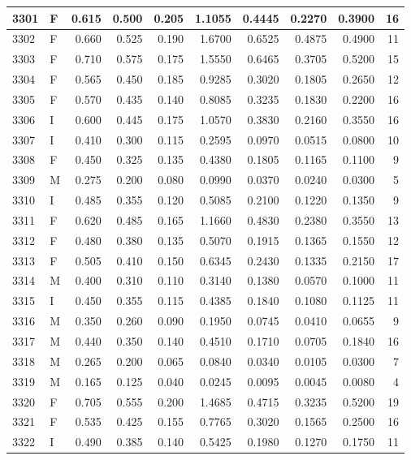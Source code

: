 \documentclass[9pt,twocolumn,twoside,]{pnas-new}
\begin{document}
\begin{tabular}{l|l|r|r|r|r|r|r|r|r}
\hline
3301 & F & 0.615 & 0.500 & 0.205 & 1.1055 & 0.4445 & 0.2270 & 0.3900 & 16\\
\hline
3302 & F & 0.660 & 0.525 & 0.190 & 1.6700 & 0.6525 & 0.4875 & 0.4900 & 11\\
\hline
3303 & F & 0.710 & 0.575 & 0.175 & 1.5550 & 0.6465 & 0.3705 & 0.5200 & 15\\
\hline
3304 & F & 0.565 & 0.450 & 0.185 & 0.9285 & 0.3020 & 0.1805 & 0.2650 & 12\\
\hline
3305 & F & 0.570 & 0.435 & 0.140 & 0.8085 & 0.3235 & 0.1830 & 0.2200 & 16\\
\hline
3306 & I & 0.600 & 0.445 & 0.175 & 1.0570 & 0.3830 & 0.2160 & 0.3550 & 16\\
\hline
3307 & I & 0.410 & 0.300 & 0.115 & 0.2595 & 0.0970 & 0.0515 & 0.0800 & 10\\
\hline
3308 & F & 0.450 & 0.325 & 0.135 & 0.4380 & 0.1805 & 0.1165 & 0.1100 & 9\\
\hline
3309 & M & 0.275 & 0.200 & 0.080 & 0.0990 & 0.0370 & 0.0240 & 0.0300 & 5\\
\hline
3310 & I & 0.485 & 0.355 & 0.120 & 0.5085 & 0.2100 & 0.1220 & 0.1350 & 9\\
\hline
3311 & F & 0.620 & 0.485 & 0.165 & 1.1660 & 0.4830 & 0.2380 & 0.3550 & 13\\
\hline
3312 & F & 0.480 & 0.380 & 0.135 & 0.5070 & 0.1915 & 0.1365 & 0.1550 & 12\\
\hline
3313 & F & 0.505 & 0.410 & 0.150 & 0.6345 & 0.2430 & 0.1335 & 0.2150 & 17\\
\hline
3314 & M & 0.400 & 0.310 & 0.110 & 0.3140 & 0.1380 & 0.0570 & 0.1000 & 11\\
\hline
3315 & I & 0.450 & 0.355 & 0.115 & 0.4385 & 0.1840 & 0.1080 & 0.1125 & 11\\
\hline
3316 & M & 0.350 & 0.260 & 0.090 & 0.1950 & 0.0745 & 0.0410 & 0.0655 & 9\\
\hline
3317 & M & 0.440 & 0.350 & 0.140 & 0.4510 & 0.1710 & 0.0705 & 0.1840 & 16\\
\hline
3318 & M & 0.265 & 0.200 & 0.065 & 0.0840 & 0.0340 & 0.0105 & 0.0300 & 7\\
\hline
3319 & M & 0.165 & 0.125 & 0.040 & 0.0245 & 0.0095 & 0.0045 & 0.0080 & 4\\
\hline
3320 & F & 0.705 & 0.555 & 0.200 & 1.4685 & 0.4715 & 0.3235 & 0.5200 & 19\\
\hline
3321 & F & 0.535 & 0.425 & 0.155 & 0.7765 & 0.3020 & 0.1565 & 0.2500 & 16\\
\hline
3322 & I & 0.490 & 0.385 & 0.140 & 0.5425 & 0.1980 & 0.1270 & 0.1750 & 11\\

\end{tabular}
\end{document}
